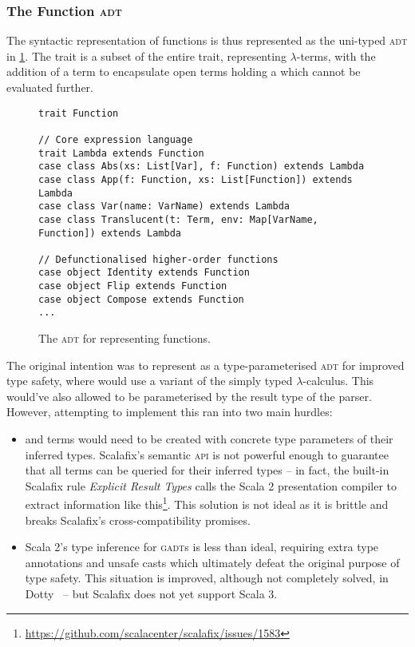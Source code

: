\documentclass[../../main.tex]{subfiles}
\begin{document}
\subsubsection{The Function \textsc{adt}}
The syntactic representation of functions is thus represented as the uni-typed  \textsc{adt} in \cref{fig:function-adt}.
The  trait is a subset of the entire  trait, representing $\lambda$-terms, with the addition of a  term to encapsulate open terms holding a  which cannot be evaluated further.

\begin{figure}
\begin{verbatim}
trait Function

// Core expression language
trait Lambda extends Function
case class Abs(xs: List[Var], f: Function) extends Lambda
case class App(f: Function, xs: List[Function]) extends Lambda
case class Var(name: VarName) extends Lambda
case class Translucent(t: Term, env: Map[VarName, Function]) extends Lambda

// Defunctionalised higher-order functions
case object Identity extends Function
case object Flip extends Function
case object Compose extends Function
...
\end{verbatim}
\caption{The  \textsc{adt} for representing functions.}
\label{fig:function-adt}
\end{figure}

The original intention was to represent  as a type-parameterised \textsc{adt} for improved type safety, where  would use a variant of the simply typed $\lambda$-calculus.
This would've also allowed  to be parameterised by the result type of the parser.
However, attempting to implement this ran into two main hurdles:
\begin{itemize}
  \item {} and  terms would need to be created with concrete type parameters of their inferred types. Scalafix's semantic \textsc{api} is not powerful enough to guarantee that all terms can be queried for their inferred types -- in fact, the built-in Scalafix rule \emph{Explicit Result Types} calls the Scala 2 presentation compiler to extract information like this\footnote{\url{https://github.com/scalacenter/scalafix/issues/1583}}. This solution is not ideal as it is brittle and breaks Scalafix's cross-compatibility promises.
  \item Scala 2's type inference for \textsc{gadt}s is less than ideal, requiring extra type annotations and unsafe casts which ultimately defeat the original purpose of type safety. This situation is improved, although not completely solved, in Dotty~\cite{parreaux_towards_2019} -- but Scalafix does not yet support Scala 3.
\end{itemize}
\end{document}
